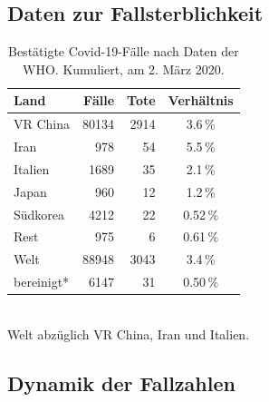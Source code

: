 \documentclass[a4paper,11pt,fleqn,twocolumn,twoside,dvipdfmx]{scrartcl}
\numberwithin{equation}{section}
\newcommand{\strong}[1]{\textbf{#1}}
\begin{document}
\subsection{Daten zur Fallsterblichkeit}
\begin{table}[h]
\caption{Bestätigte Covid-19-Fälle\newline
nach Daten der WHO.\newline
Kumuliert, am 2. März 2020.}
\begin{tabular}{lrrc}
\toprule
\strong{Land} & \strong{Fälle} & \strong{Tote} & \strong{Verhältnis}\\
\midrule
VR China & 80134 & 2914 & 3.6\,\%\\
Iran & 978 & 54 & 5.5\,\%\\ 
Italien & 1689 & 35 & 2.1\,\%\\
Japan & 960 & 12 &  1.2\,\%\\
Südkorea & 4212 & 22 & 0.52\,\%\\
Rest & 975 & 6 & 0.61\,\%\\
\midrule
Welt & 88948 & 3043 & 3.4\,\%\\
bereinigt* & 6147 & 31 & 0.50\,\%\\
\bottomrule
\end{tabular}\\[4pt]
{\small *Welt abzüglich VR China, Iran und Italien.}
\end{table}

\subsection{Dynamik der Fallzahlen}
\end{document}
